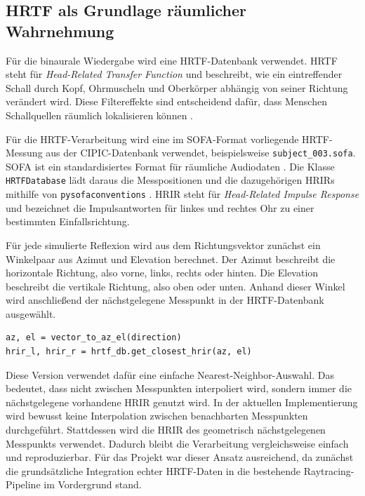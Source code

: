 \subsection{HRTF als Grundlage räumlicher Wahrnehmung}
\label{subsec:hrtf_foundation}

Für die binaurale Wiedergabe wird eine HRTF-Datenbank verwendet. HRTF steht für \textit{Head-Related Transfer Function} und beschreibt, wie ein eintreffender Schall durch Kopf, Ohrmuscheln und Oberkörper abhängig von seiner Richtung verändert wird. Diese Filtereffekte sind entscheidend dafür, dass Menschen Schallquellen räumlich lokalisieren können \parencite{vorlaender2008}.

Für die HRTF-Verarbeitung wird eine im SOFA-Format vorliegende HRTF-Messung aus der CIPIC-Datenbank \parencite{algazi2001,sofa_cipic_06} verwendet, beispielsweise \texttt{subject\_003.sofa}. SOFA ist ein standardisiertes Format für räumliche Audiodaten \parencite{aes69}. Die Klasse \texttt{HRTFDatabase} lädt daraus die Messpositionen und die dazugehörigen HRIRs mithilfe von \texttt{pysofaconventions} \parencite{pysofaconventions}. HRIR steht für \textit{Head-Related Impulse Response} und bezeichnet die Impulsantworten für linkes und rechtes Ohr zu einer bestimmten Einfallsrichtung.

Für jede simulierte Reflexion wird aus dem Richtungsvektor zunächst ein Winkelpaar aus Azimut und Elevation berechnet. Der Azimut beschreibt die horizontale Richtung, also vorne, links, rechts oder hinten. Die Elevation beschreibt die vertikale Richtung, also oben oder unten. Anhand dieser Winkel wird anschließend der nächstgelegene Messpunkt in der HRTF-Datenbank ausgewählt.

\begin{lstlisting}
az, el = vector_to_az_el(direction)
hrir_l, hrir_r = hrtf_db.get_closest_hrir(az, el)
\end{lstlisting}

Diese Version verwendet dafür eine einfache Nearest-Neighbor-Auswahl. Das bedeutet, dass nicht zwischen Messpunkten interpoliert wird, sondern immer die nächstgelegene vorhandene HRIR genutzt wird. In der aktuellen Implementierung wird bewusst keine Interpolation zwischen benachbarten Messpunkten durchgeführt. Stattdessen wird die HRIR des geometrisch nächstgelegenen Messpunkts verwendet. Dadurch bleibt die Verarbeitung vergleichsweise einfach und reproduzierbar. Für das Projekt war dieser Ansatz ausreichend, da zunächst die grundsätzliche Integration echter HRTF-Daten in die bestehende Raytracing-Pipeline im Vordergrund stand.

